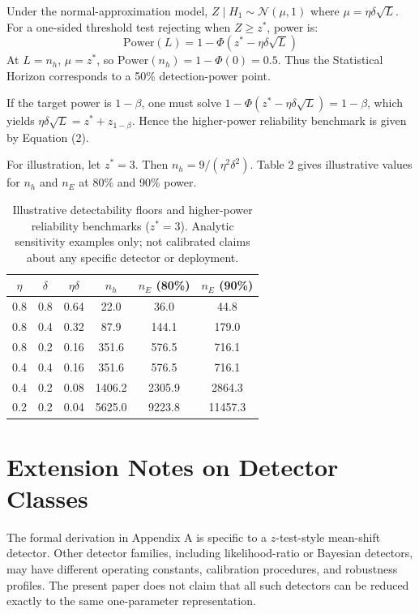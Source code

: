 \documentclass[11pt]{article}
\begin{document}
Under the normal-approximation model, $Z \mid H_1 \sim \mathcal{N}(\mu, 1)$ where
$\mu = \eta\delta\sqrt{L}$. For a one-sided threshold test rejecting when $Z \geq
z^*$, power is:
\begin{equation}
\mathrm{Power}(L) = 1 - \Phi(z^* - \eta\delta\sqrt{L})
\end{equation}
At $L = n_h$, $\mu = z^*$, so $\mathrm{Power}(n_h) = 1 - \Phi(0) = 0.5$. Thus the
Statistical Horizon corresponds to a 50\% detection-power point.

If the target power is $1-\beta$, one must solve $1 - \Phi(z^* - \eta\delta\sqrt{L})
= 1-\beta$, which yields $\eta\delta\sqrt{L} = z^* + z_{1-\beta}$. Hence the
higher-power reliability benchmark is given by Equation (2).

For illustration, let $z^* = 3$. Then $n_h = 9/(\eta^2\delta^2)$. Table 2 gives
illustrative values for $n_h$ and $n_E$ at 80\% and 90\% power.

\begin{table}[h]
\centering
\caption{Illustrative detectability floors and higher-power reliability benchmarks
($z^* = 3$). Analytic sensitivity examples only; not calibrated claims about any
specific detector or deployment.}
\begin{tabular}{cccccc}
\toprule
$\eta$ & $\delta$ & $\eta\delta$ & $n_h$ & $n_E$ (80\%) & $n_E$ (90\%)\\
\midrule
0.8 & 0.8 & 0.64 & 22.0 & 36.0 & 44.8\\
0.8 & 0.4 & 0.32 & 87.9 & 144.1 & 179.0\\
0.8 & 0.2 & 0.16 & 351.6 & 576.5 & 716.1\\
0.4 & 0.4 & 0.16 & 351.6 & 576.5 & 716.1\\
0.4 & 0.2 & 0.08 & 1406.2 & 2305.9 & 2864.3\\
0.2 & 0.2 & 0.04 & 5625.0 & 9223.8 & 11457.3\\
\bottomrule
\end{tabular}
\end{table}

\section{Extension Notes on Detector Classes}

The formal derivation in Appendix A is specific to a $z$-test-style mean-shift
detector. Other detector families, including likelihood-ratio or Bayesian detectors,
may have different operating constants, calibration procedures, and robustness
profiles. The present paper does not claim that all such detectors can be reduced
exactly to the same one-parameter representation.
\end{document}
